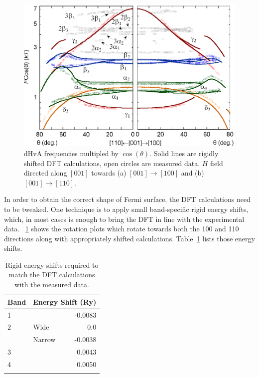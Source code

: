 {{{\begin{figure}[h!]
    \begin{center}
        \includegraphics[scale=0.9]{Chapter3-dHvABaFe2P2/Figures/AngleDepMeasurements/AngleSweepRigidShift/AngleSweepRigidShift}
        \caption{dHvA frequencies multipled by $\cos(\theta)$. Solid lines are rigidly shifted DFT calculations, open circles are measured data. $H$ field directed along $[001]$ towards (a) $[001]\rightarrow[100]$ and (b) $[001]\rightarrow[110]$.}
        \label{Fig:3:AngleSweepRigidShift}
    \end{center}
\end{figure}

In order to obtain the correct shape of Fermi surface, the DFT calculations need to be tweaked. One technique is to apply small band-specific rigid energy shifts, which, in most cases is enough to bring the DFT in line with the experimental data. \fig~\ref{Fig:3:AngleSweepRigidShift} shows the rotation plots which rotate towards both the 100 and 110 directions along with appropriately shifted calculations. Table~\ref{Table:3:EnergyShifts} lists those energy shifts.

\medskip

\begin{table}
    \begin{center}
        \caption{Rigid energy shifts required to match the DFT calculations with the measured data.}
        \begin{tabular}[h!]{llr}
\toprule
Band    & \multicolumn{2}{l}{Energy Shift (\unit{Ry})} \\
\midrule
1       &       & -0.0083      \\
2       & Wide  & 0.0          \\
        & Narrow & -0.0038     \\
3       &       & 0.0043       \\
4       &       & 0.0050        \\
\bottomrule
        \label{Table:3:EnergyShifts}
        \end{tabular}
    \end{center}
\end{table}

}}}
